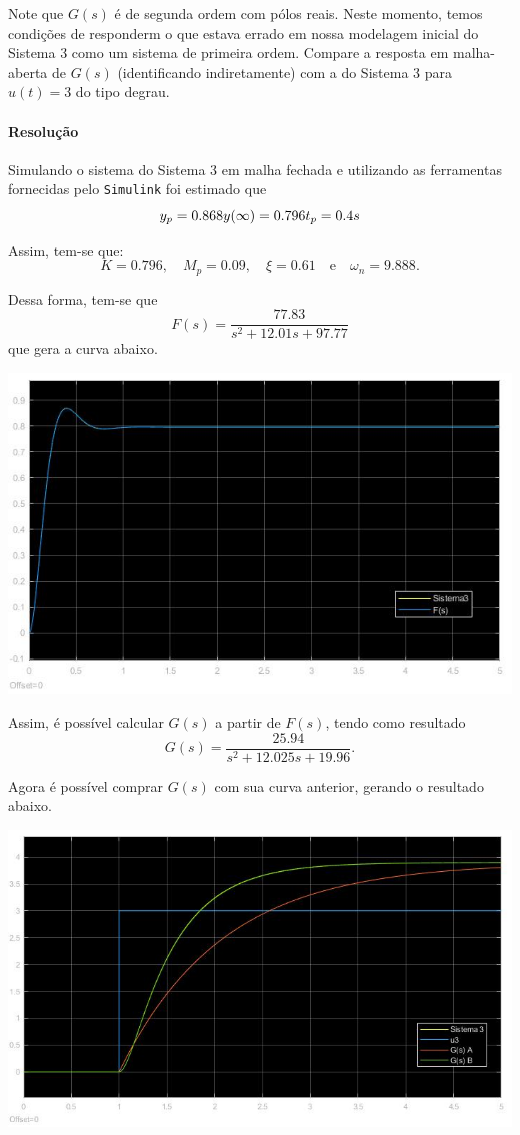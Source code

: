 \documentclass[
]{book}
\begin{document}
Note que \(G(s)\) é de segunda ordem com pólos reais. Neste momento, temos condições de responderm o que estava errado em nossa modelagem inicial do Sistema 3 como um sistema de primeira ordem. Compare a resposta em malha-aberta de \(G(s)\) (identificando indiretamente) com a do Sistema 3 para \(u(t) = 3\) do tipo degrau.

\hypertarget{resoluuxe7uxe3o-3}{%
\paragraph*{Resolução}\label{resoluuxe7uxe3o-3}}

Simulando o sistema do Sistema 3 em malha fechada e utilizando as ferramentas fornecidas pelo \texttt{Simulink} foi estimado que
\[
y_p = 0.868 \\
y(\infty) = 0.796 \\
t_p = 0.4s
\]

Assim, tem-se que:
\[
K = 0.796, \quad M_p = 0.09, \quad \xi = 0.61 \quad \text{e} \quad \omega_n= 9.888.
\]

Dessa forma, tem-se que
\[
F(s) = \frac {77.83}{s^2+ 12.01s +97.77}
\]
que gera a curva abaixo.

\includegraphics{Imagens/Lab3/Resolução/prob3BA.jpg}

Assim, é possível calcular \(G(s)\) a partir de \(F(s)\), tendo como resultado
\[
G(s) = \frac {25.94}{s^2+12.025s+19.96}.
\]

Agora é possível comprar \(G(s)\) com sua curva anterior, gerando o resultado abaixo.

\includegraphics{Imagens/Lab3/Resolução/prob3BB.jpg}
\end{document}

